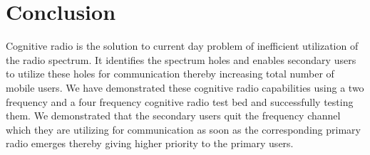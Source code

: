 \chapter{Conclusion}

Cognitive radio is the solution to current day problem of inefficient 
utilization of the radio spectrum. It identifies the spectrum holes and 
enables secondary users to utilize these holes for communication thereby 
increasing total number of mobile users. We have demonstrated these cognitive
radio capabilities using a two frequency and a four frequency cognitive radio
test bed and successfully testing them.  We demonstrated that the secondary 
users quit the frequency channel which they are utilizing for communication
as soon as the corresponding primary radio emerges thereby giving higher
priority to the primary users.